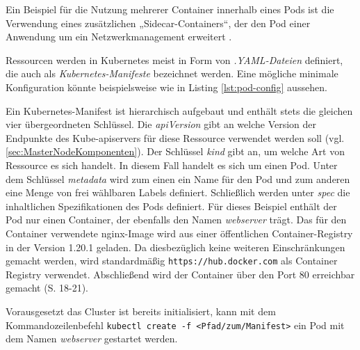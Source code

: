 \documentclass[11pt,a4paper]{article}
\begin{document}
Ein Beispiel für die Nutzung mehrerer Container innerhalb eines Pods ist die Verwendung
eines zusätzlichen „Sidecar-Containers“, der den Pod einer Anwendung um ein Netzwerkmanagement erweitert \cite{9783969109625}.

Ressourcen werden in Kubernetes meist in Form von \emph{.YAML-Dateien} definiert,
die auch als \emph{Kubernetes-Manifeste} bezeichnet werden.
Eine mögliche minimale Konfiguration könnte beispielsweise wie in Listing \ref{lst:pod-config} aussehen.

% 

Ein Kubernetes-Manifest ist hierarchisch aufgebaut
und enthält stets die gleichen vier übergeordneten Schlüssel.
Die \emph{apiVersion} gibt an welche Version der Endpunkte des Kube-apiservers für diese Ressource
verwendet werden soll (vgl. \ref{sec:MasterNodeKomponenten}).
Der Schlüssel \emph{kind} gibt an, um welche Art von Ressource es sich handelt.
In diesem Fall handelt es sich um einen Pod.
Unter dem Schlüssel \emph{metadata} wird zum einen ein Name für den Pod
und zum anderen eine Menge von frei wählbaren Labels definiert.
Schließlich werden unter \emph{spec} die inhaltlichen Spezifikationen des Pods
definiert. Für dieses Beispiel enthält der Pod nur einen Container, der ebenfalls den Namen
\emph{webserver} trägt. Das für den Container verwendete nginx-Image \cite{nginx} wird aus einer
öffentlichen Container-Registry in der Version 1.20.1 geladen. Da diesbezüglich keine weiteren
Einschränkungen gemacht werden, wird standardmäßig \linebreak \lstinline|https://hub.docker.com| als Container Registry
verwendet. Abschließend wird der Container über den Port 80 erreichbar gemacht \cite{Schmeling_Dargatz_2022} (S. 18-21).

Vorausgesetzt das Cluster ist bereits initialisiert, kann mit dem Kommandozeilenbefehl
\lstinline|kubectl create -f <Pfad/zum/Manifest>|
ein Pod mit dem Namen \emph{webserver} gestartet werden.
\end{document}

